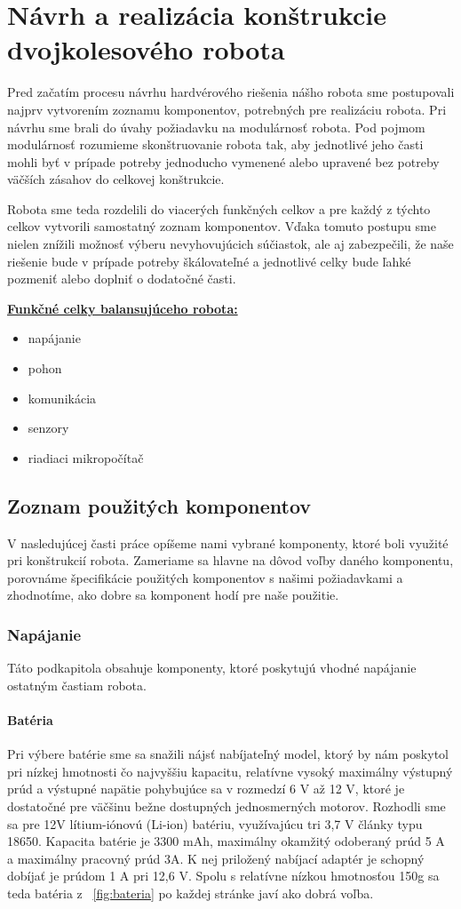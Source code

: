 \chapter{Návrh a realizácia konštrukcie dvojkolesového robota}

Pred začatím procesu návrhu hardvérového riešenia nášho robota sme postupovali najprv vytvorením zoznamu komponentov, potrebných pre realizáciu robota. Pri návrhu sme brali do úvahy požiadavku na modulárnosť robota. Pod pojmom modulárnosť rozumieme skonštruovanie robota tak, aby jednotlivé jeho časti mohli byť v prípade potreby jednoducho vymenené alebo upravené bez potreby väčších zásahov do celkovej konštrukcie. 

Robota sme teda rozdelili do viacerých funkčných celkov a pre každý z týchto celkov vytvorili samostatný zoznam komponentov. Vďaka tomuto postupu sme nielen znížili možnosť výberu nevyhovujúcich súčiastok, ale aj zabezpečili, že naše riešenie bude v prípade potreby škálovateľné a jednotlivé celky bude ľahké pozmeniť alebo doplniť o dodatočné časti. 


\underline{\textbf{Funkčné celky balansujúceho robota:}}
\begin{itemize}
\item napájanie
\item pohon
\item komunikácia
\item senzory
\item riadiaci mikropočítač
\end{itemize}

\section{Zoznam použitých komponentov}

V nasledujúcej časti práce opíšeme nami vybrané komponenty, ktoré boli využité pri konštrukcií robota. Zameriame sa hlavne na dôvod voľby daného komponentu, porovnáme špecifikácie použitých komponentov s našimi požiadavkami a zhodnotíme, ako dobre sa komponent hodí pre naše použitie.


\subsection{Napájanie}
Táto podkapitola obsahuje komponenty, ktoré poskytujú vhodné napájanie ostatným častiam robota.
\subsubsection{Batéria}
Pri výbere batérie sme sa snažili nájsť nabíjateľný model, ktorý by nám poskytol pri nízkej hmotnosti čo najvyššiu kapacitu, relatívne vysoký maximálny výstupný prúd a  výstupné napätie pohybujúce sa v rozmedzí 6 V až 12 V, ktoré je dostatočné pre väčšinu bežne dostupných jednosmerných motorov. Rozhodli sme sa pre 12V lítium-iónovú (Li-ion) batériu, využívajúcu tri 3,7 V články typu 18650. Kapacita batérie je 3300 mAh, maximálny okamžitý odoberaný prúd 5 A a maximálny pracovný prúd 3A. K nej priložený nabíjací adaptér je schopný dobíjať je prúdom 1 A pri 12,6 V. Spolu s relatívne nízkou hmotnosťou 150g sa teda batéria z \figurename~\ref{fig:bateria} po každej stránke javí ako dobrá voľba. 

